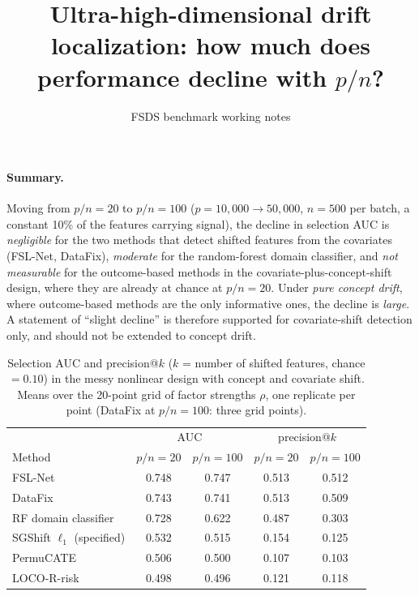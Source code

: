 \documentclass[11pt]{article}
\title{Ultra-high-dimensional drift localization: how much does performance decline with $p/n$?}
\author{FSDS benchmark working notes}
\date{}
\begin{document}
\maketitle
\vspace{-1.5em}

\paragraph{Summary.}
Moving from $p/n=20$ to $p/n=100$ ($p=10{,}000\to50{,}000$, $n=500$ per batch, a constant 10\% of the features carrying signal), the decline in selection AUC is \emph{negligible} for the two methods that detect shifted features from the covariates (FSL-Net, DataFix), \emph{moderate} for the random-forest domain classifier, and \emph{not measurable} for the outcome-based methods in the covariate-plus-concept-shift design, where they are already at chance at $p/n=20$. Under \emph{pure concept drift}, where outcome-based methods are the only informative ones, the decline is \emph{large}. A statement of ``slight decline'' is therefore supported for covariate-shift detection only, and should not be extended to concept drift.

\begin{table}[h]
\centering
\caption{Selection AUC and precision@$k$ ($k$ = number of shifted features, chance $=0.10$) in the messy nonlinear design with concept and covariate shift. Means over the 20-point grid of factor strengths $\rho$, one replicate per point (DataFix at $p/n=100$: three grid points).}
\begin{tabular}{lcccc}
\toprule
 & \multicolumn{2}{c}{AUC} & \multicolumn{2}{c}{precision@$k$} \\
Method & $p/n=20$ & $p/n=100$ & $p/n=20$ & $p/n=100$ \\
\midrule
FSL-Net            & 0.748 & 0.747 & 0.513 & 0.512 \\
DataFix            & 0.743 & 0.741 & 0.513 & 0.509 \\
RF domain classifier & 0.728 & 0.622 & 0.487 & 0.303 \\
SGShift $\ell_1$ (specified) & 0.532 & 0.515 & 0.154 & 0.125 \\
PermuCATE          & 0.506 & 0.500 & 0.107 & 0.103 \\
LOCO-R-risk        & 0.498 & 0.496 & 0.121 & 0.118 \\
\bottomrule
\end{tabular}
\end{table}
\end{document}
